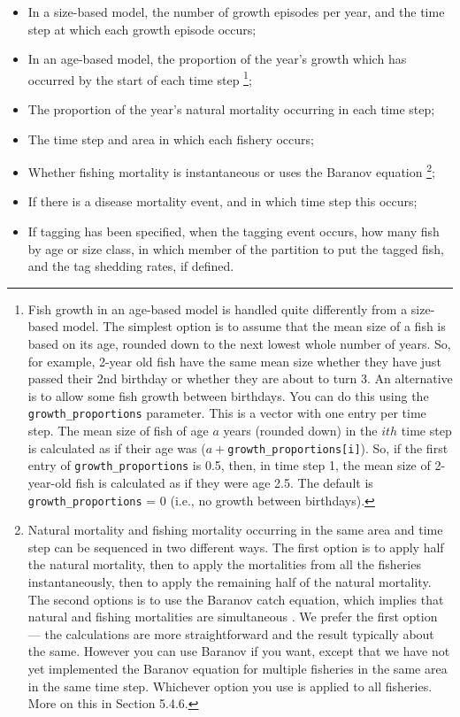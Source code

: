 \begin{itemize}
\item	In a size-based model, the number of growth episodes per year, and the time step at which each growth episode occurs;
\item	In an age-based model, the proportion of the year’s growth which has occurred by the start of each time step \footnote{Fish growth in an age-based model is handled quite differently from a size-based model. The simplest option is to assume that the mean size of a fish is based on its age, rounded down to the next lowest whole number of years. So, for example, 2-year old fish have the same mean size whether they have just passed their 2nd birthday or whether they are about to turn 3. An alternative is to allow some fish growth between birthdays. You can do this using the \texttt{growth\_proportions} parameter. This is a vector with one entry per time step. The mean size of fish of age $a$ years (rounded down) in the $ith$ time step is calculated as if their age was ($a+$\texttt{growth\_proportions[i]}). So, if the first entry of \texttt{growth\_proportions} is 0.5, then, in time step 1, the mean size of 2-year-old fish is calculated as if they were age 2.5. The default is \texttt{growth\_proportions} = 0 (i.e., no growth between birthdays).};
\item	The proportion of the year’s natural mortality occurring in each time step;
\item	The time step and area in which each fishery occurs;
\item Whether fishing mortality is instantaneous or uses the Baranov equation \footnote{
  Natural mortality and fishing mortality occurring in the same area and time step can be sequenced in two different ways. The first option is to apply half the natural mortality, then to apply the mortalities from all the fisheries instantaneously, then to apply the remaining half of the natural mortality. The second options is to use the Baranov catch equation, which implies that natural and fishing mortalities are simultaneous . We prefer the first option — the calculations are more straightforward and the result typically about the same. However you can use Baranov if you want, except that we have not yet implemented the Baranov equation for multiple fisheries in the same area in the same time step. Whichever option you use is applied to all fisheries. More on this in Section 5.4.6.
};
\item If there is a disease mortality event, and in which time step this occurs;
\item	If tagging has been specified, when the tagging event occurs, how many fish by age or size class, in which member of the partition to put the tagged fish, and the tag shedding rates, if defined.
\end{itemize}

